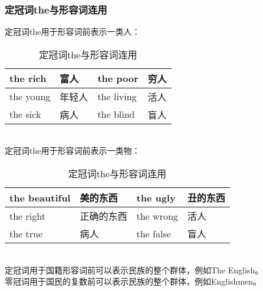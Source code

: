 \documentclass[UTF8]{ctexart}
\newcommand{\littf}[1]{{\hspace{3pt}\ttfamily #1}}
\begin{document}
\subsubsection{定冠词\littf{the}与形容词连用}
    定冠词\littf{the}用于形容词前表示一类人：
    \begin{table}[h]
        \begin{center}
            \ttfamily
            \begin{tabular}{p{105pt}|p{60pt}|p{105pt}|p{60pt}}
                \hline
                the rich&富人&the poor&穷人\\ \hline
                the young&年轻人&the living&活人\\ \hline
                the sick&病人&the blind&盲人\\ \hline
            \end{tabular}
            \rmfamily
            \caption{定冠词\littf{the}与形容词连用}
        \end{center}
    \end{table}\\
    定冠词\littf{the}用于形容词前表示一类物：
    \begin{table}[h]
        \begin{center}
            \ttfamily
            \begin{tabular}{p{105pt}|p{60pt}|p{105pt}|p{60pt}}
                \hline
                the beautiful&美的东西&the ugly&丑的东西\\ \hline
                the right&正确的东西&the wrong&活人\\ \hline
                the true&病人&the false&盲人\\ \hline
            \end{tabular}
            \rmfamily
            \caption{定冠词\littf{the}与形容词连用}
        \end{center}
    \end{table}\\
    定冠词用于国籍形容词前可以表示民族的整个群体，例如\littf{The English}。\\[3mm]
    零冠词用于国民的复数前可以表示民族的整个群体，例如\littf{Englishmen}。

\newpage
\end{document}
